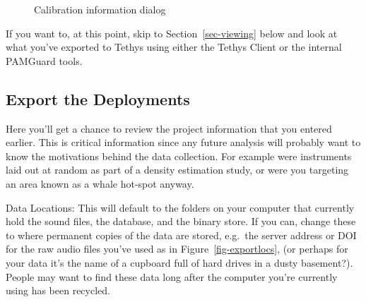 \documentclass[
]{article}
\begin{document}
\begin{figure}
\begin{minipage}{0.50\linewidth}
{}


\end{minipage}%

\caption{\label{fig-cal}Calibration information dialog}

\end{figure}%

\begin{tcolorbox}[enhanced jigsaw, breakable, colbacktitle=quarto-callout-tip-color!10!white, colback=white, left=2mm, arc=.35mm, leftrule=.75mm, bottomtitle=1mm, bottomrule=.15mm, title=\textcolor{quarto-callout-tip-color}{\faLightbulb}\hspace{0.5em}{See what you've exported so far}, opacitybacktitle=0.6, colframe=quarto-callout-tip-color-frame, toptitle=1mm, toprule=.15mm, opacityback=0, coltitle=black, rightrule=.15mm, titlerule=0mm]

If you want to, at this point, skip to Section~\ref{sec-viewing} below
and look at what you've exported to Tethys using either the Tethys
Client or the internal PAMGuard tools.

\end{tcolorbox}

\subsection{Export the Deployments}\label{export-the-deployments}

Here you'll get a chance to review the project information that you
entered earlier. This is critical information since any future analysis
will probably want to know the motivations behind the data collection.
For example were instruments laid out at random as part of a density
estimation study, or were you targeting an area known as a whale
hot-spot anyway.

Data Locations: This will default to the folders on your computer that
currently hold the sound files, the database, and the binary store. If
you can, change these to where permanent copies of the data are stored,
e.g.~the server address or DOI for the raw audio files you've used as in
Figure~\ref{fig-exportlocs}, (or perhaps for your data it's the name of
a cupboard full of hard drives in a dusty basement?). People may want to
find these data long after the computer you're currently using has been
recycled.
\end{document}
